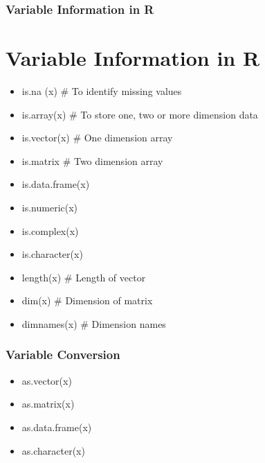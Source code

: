 \documentclass[12pt]{beamer}
\begin{document}
\begin{frame}[fragile]
\frametitle{Variable Information in R}
\section{Variable Information in R}
\begin{itemize}\justifying
	\item is.na (x) \hfill\# To identify missing values
	\item is.array(x) \hfill\# To store one, two or more dimension data
	\item is.vector(x) \hfill\# One dimension array
	\item is.matrix \hfill\# Two dimension array
	\item is.data.frame(x)
	\item is.numeric(x)
	\item is.complex(x)
	\item is.character(x)
	\item length(x)  \hfill\# Length of vector
	\item dim(x)  \hfill\# Dimension of matrix
	\item dimnames(x)  \hfill\# Dimension names
\end{itemize}
\end{frame}


\begin{frame}
\frametitle{Variable Conversion}
\begin{itemize}
	\item as.vector(x)
	\item as.matrix(x)
	\item as.data.frame(x)
	\item as.character(x)
\end{itemize}
\end{frame}
\end{document}
